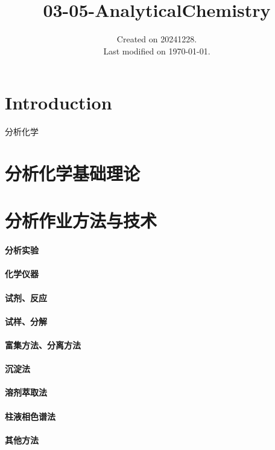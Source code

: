 \documentclass[UTF8]{../03-Chemistry}
\begin{document}
\title{03-05-AnalyticalChemistry}
\date{Created on 20241228.\\   Last modified on \today.}
\maketitle
\tableofcontents


\chapter{Introduction}

分析化学

\chapter{分析化学基础理论}



\chapter{分析作业方法与技术}
\subsubsection{分析实验}
\subsubsection{化学仪器}
\subsubsection{试剂、反应}
\subsubsection{试样、分解}
\subsubsection{富集方法、分离方法}
\subsubsection{沉淀法}
\subsubsection{溶剂萃取法}
\subsubsection{柱液相色谱法}
\subsubsection{其他方法}
\end{document}
